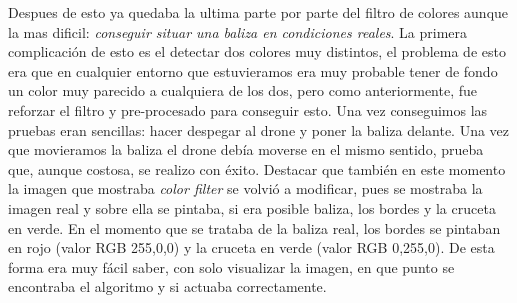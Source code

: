 \hspace{1cm} Despues de esto ya quedaba la ultima parte por parte del filtro de colores aunque la mas dificil: \textit{conseguir situar una baliza en condiciones reales}. La primera complicaci\'on de esto es el detectar dos colores muy distintos, el problema de esto era que en cualquier entorno que estuvieramos era muy probable tener de fondo un color muy parecido a cualquiera de los dos, pero como anteriormente, fue reforzar el filtro y pre-procesado para conseguir esto. Una vez conseguimos las pruebas eran sencillas: hacer despegar al drone y poner la baliza delante. Una vez que movieramos la baliza el drone deb\'ia moverse en el mismo sentido, prueba que, aunque costosa, se realizo con \'exito. Destacar que tambi\'en en este momento la imagen que mostraba \textit{color filter} se volvi\'o a modificar, pues se mostraba la imagen real y sobre ella se pintaba, si era posible baliza, los bordes y la cruceta en verde. En el momento que se trataba de la baliza real, los bordes se pintaban en rojo (valor RGB 255,0,0) y la cruceta en verde (valor RGB 0,255,0). De esta forma era muy f\'acil saber, con solo visualizar la imagen, en que punto se encontraba el algoritmo y si actuaba correctamente.



